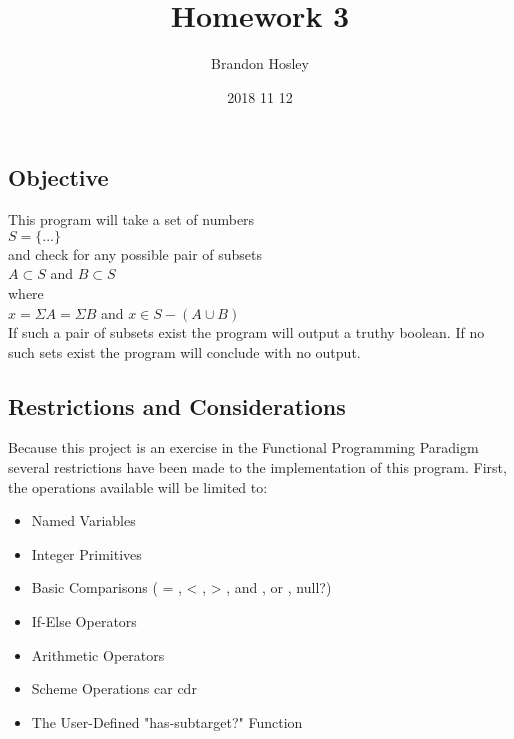 \documentclass[a4paper,man,natbib]{apa6}
\title{Homework 3}
\author{Brandon Hosley}
\date{2018 11 12}
\affiliation{Brian-Thomas Rogers}
\begin{document}
\maketitle
\raggedbottom
\subsection{Objective}
\noindent
This program will take a set of numbers \\ 
$S = \{...\}$ \\ \noindent
and check for any possible pair of subsets \\
$ A \subset S $ and $ B \subset S $ \\ \noindent
where \\
$x = \Sigma A = \Sigma B$ and $x \in S-(A \cup B)$ \\ \noindent
If such a pair of subsets exist the program will output a truthy boolean. If no such sets exist the program will conclude with no output.

\subsection{Restrictions and Considerations}
Because this project is an exercise in the Functional Programming Paradigm several restrictions have been made to the implementation of this program. First, the operations available will be limited to: \\
\singlespacing
\begin{itemize}
	\item Named Variables
	\item Integer Primitives
	\item Basic Comparisons ( = , < , > , and , or , null?)
	\item If-Else Operators
	\item Arithmetic Operators
	\item Scheme Operations 
		\subitem car
		\subitem cdr
	\item The User-Defined "has-subtarget?" Function
\end{itemize}
\doublespacing
\end{document}
